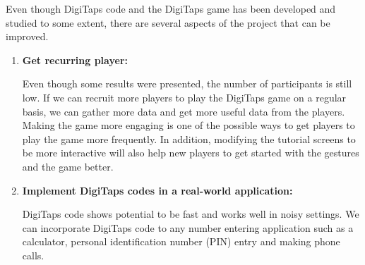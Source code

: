 \par
Even though DigiTaps code and the DigiTaps game has been developed and studied to some extent, there are several aspects of the project that can be improved.
\begin{enumerate}
  \item \textbf{Get recurring player:}
  \par
   Even though some results were presented, the number of participants is still low. If we can recruit more players to play the DigiTaps game on a regular basis, we can gather more data and get more useful data from the players. Making the game more engaging is one of the possible ways to get players to play the game more frequently. In addition, modifying the tutorial screens to be more interactive will also help new players to get started with the gestures and the game better.

  \item \textbf{Implement DigiTaps codes in a real-world application:}
  \par
  DigiTaps code shows potential to be fast and works well in noisy settings. We can incorporate DigiTaps code to any number entering application such as a calculator, personal identification number (PIN) entry and making phone calls.
\end{enumerate}


\begin{comment}
  Outline:
    - In depth data analysis on the data gathered from DigiTaps
    - Use DigiTaps gesture on real-world applications for entering numbers such as a calculator.
    - DigiTaps was designed to be a framework for doing text or number entry user study. Other people can take DigiTaps and use it for their user study in the large.
\end{comment}